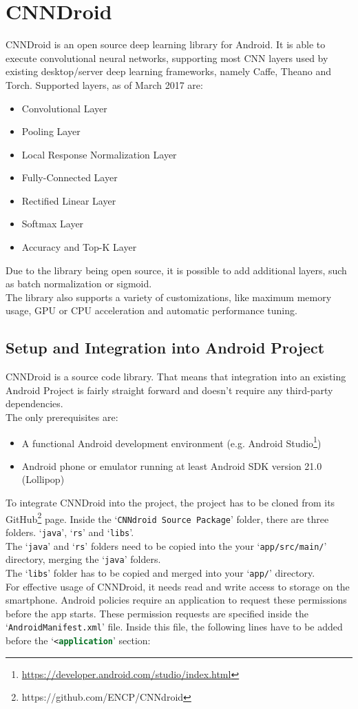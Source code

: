 \section{CNNDroid}
CNNDroid is an open source deep learning library for Android. It is able to execute convolutional neural networks, supporting most CNN layers used by existing desktop/server deep learning frameworks, namely Caffe, Theano and Torch. Supported layers, as of March 2017 are:
\begin{itemize}
    \item{Convolutional Layer}
    \item{Pooling Layer}
    \item{Local Response Normalization Layer}
    \item{Fully-Connected Layer}
    \item{Rectified Linear Layer}
    \item{Softmax Layer}
    \item{Accuracy and Top-K Layer}
\end{itemize}
Due to the library being open source, it is possible to add additional layers, such as batch normalization or sigmoid.\\
The library also supports a variety of customizations, like maximum memory usage, GPU or CPU acceleration and automatic performance tuning.

\subsection{Setup and Integration into Android Project}
CNNDroid is a source code library. That means that integration into an existing Android Project is fairly straight forward and doesn't require any third-party dependencies.\\
The only prerequisites are:
\begin{itemize}
    \item{A functional Android development environment (e.g. Android Studio\footnote{\url{https://developer.android.com/studio/index.html}})}
    \item{Android phone or emulator running at least Android SDK version 21.0 (Lollipop)}
\end{itemize}

To integrate CNNDroid into the project, the project has to be cloned from its GitHub\footnote{https://github.com/ENCP/CNNdroid} page. Inside the `\texttt{CNNdroid Source Package}' folder, there are three folders. `\texttt{java}', `\texttt{rs}' and `\texttt{libs}'.\\
The `\texttt{java}' and `\texttt{rs}' folders need to be copied into the your `\texttt{app/src/main/}' directory, merging the `\texttt{java}' folders.\\
The `\texttt{libs}' folder has to be copied and merged into your `\texttt{app/}' directory.\\
For effective usage of CNNDroid, it needs read and write access to storage on the smartphone. Android policies require an application to request these permissions before the app starts. These permission requests are specified inside the `\texttt{AndroidManifest.xml}' file. Inside this file, the following lines have to be added before the `\lstinline[language=XML]{<application}' section:

